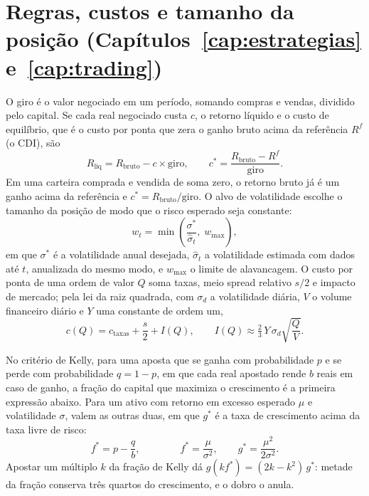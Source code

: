 \section{Regras, custos e tamanho da posição (Capítulos~\ref{cap:estrategias} e~\ref{cap:trading})}

O giro é o valor negociado em um período, somando compras e vendas, dividido pelo capital. Se cada real negociado custa $c$, o retorno líquido e o custo de equilíbrio, que é o custo por ponta que zera o ganho bruto acima da referência $R^f$ (o CDI), são
\begin{equation*}
R_{\text{líq}} = R_{\text{bruto}} - c \times \text{giro} , \qquad
c^{*} = \frac{R_{\text{bruto}} - R^{f}}{\text{giro}} .
\end{equation*}
Em uma carteira comprada e vendida de soma zero, o retorno bruto já é um ganho acima da referência e $c^{*} = R_{\text{bruto}}/\text{giro}$. O alvo de volatilidade escolhe o tamanho da posição de modo que o risco esperado seja constante:
\begin{equation*}
w_t = \min\!\left(\frac{\sigma^{*}}{\hat\sigma_t},\; w_{\max}\right) ,
\end{equation*}
em que $\sigma^{*}$ é a volatilidade anual desejada, $\hat\sigma_t$ a volatilidade estimada com dados até $t$, anualizada do mesmo modo, e $w_{\max}$ o limite de alavancagem. O custo por ponta de uma ordem de valor $Q$ soma taxas, meio spread relativo $s/2$ e impacto de mercado; pela lei da raiz quadrada, com $\sigma_d$ a volatilidade diária, $V$ o volume financeiro diário e $Y$ uma constante de ordem um,
\begin{equation*}
c(Q) = c_{\text{taxas}} + \frac{s}{2} + I(Q) , \qquad
I(Q) \approx \tfrac{2}{3}\, Y \, \sigma_d \sqrt{\frac{Q}{V}} .
\end{equation*}

No critério de Kelly, para uma aposta que se ganha com probabilidade $p$ e se perde com probabilidade $q = 1-p$, em que cada real apostado rende $b$ reais em caso de ganho, a fração do capital que maximiza o crescimento é a primeira expressão abaixo. Para um ativo com retorno em excesso esperado $\mu$ e volatilidade $\sigma$, valem as outras duas, em que $g^{*}$ é a taxa de crescimento acima da taxa livre de risco:
\begin{equation*}
f^{*} = p - \frac{q}{b} , \qquad\qquad
f^{*} = \frac{\mu}{\sigma^{2}} , \qquad g^{*} = \frac{\mu^{2}}{2\sigma^{2}} .
\end{equation*}
Apostar um múltiplo $k$ da fração de Kelly dá $g(k f^{*}) = (2k - k^{2})\, g^{*}$: metade da fração conserva três quartos do crescimento, e o dobro o anula.

